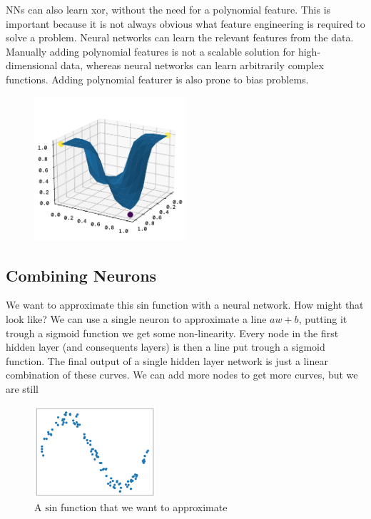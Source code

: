 \documentclass[twoside,11pt]{report}
\begin{document}
NNs can also learn xor, without the need for a polynomial feature. This is important because it is not 
always obvious what feature engineering is required to solve a problem. Neural networks can learn the 
relevant 
features from the data. Manually adding polynomial features is not a scalable solution for 
high-dimensional data,
whereas neural networks can learn arbitrarily complex functions. Adding polynomial featurer 
is also prone to 
bias problems.


\begin{figure}[!h]
    \begin{center}
        \includegraphics[width=0.5\textwidth]{../runsAndFigures/xor_nn.png}
    \end{center}
    \caption{}\label{fig:xor_nn}
\end{figure}



\subsection*{Combining Neurons}
\label{app:neuronscombined}

We want to approximate this sin function with a neural network. How might that look like?
We can use a single neuron to approximate a line $a w + b$, putting it trough a sigmoid function
we get some non-linearity. Every node in the first hidden layer (and consequents layers) is then 
a line put trough a sigmoid function. The final output of a single hidden layer network is just
a linear combination of these curves. We can add more nodes to get more curves, but we are still


\begin{figure}
    \begin{center}
        \includegraphics[width=0.4\textwidth]{../runsAndFigures/sin.png}
    \end{center}
    \caption{A $\text{sin}$ function that we want to approximate}\label{fig:sin}
\end{figure}
\end{document}
